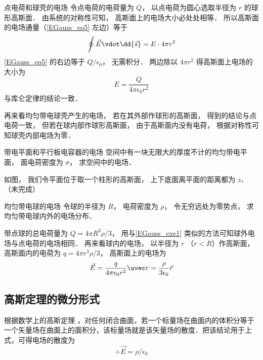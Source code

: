 \begin{exam}{点电荷和球壳的电场}\label{EGauss_exe1}
令点电荷的电荷量为 $Q$， 以点电荷为圆心选取半径为 $r$ 的球形高斯面． 由系统的对称性可知， 高斯面上的电场大小必处处相等． 所以高斯面的电场通量（\autoref{EGauss_eq5} 左边）等于
\begin{equation}
\oint \vec E \vdot \dd{\vec s} = E \cdot 4\pi r^2
\end{equation}
\autoref{EGauss_eq5} 的右边等于 $Q/\epsilon_0$， 无需积分． 两边除以 $4\pi r^2$ 得高斯面上电场的大小为
\begin{equation}
E = \frac{Q}{4\pi\epsilon_0 r^2}
\end{equation}
与库仑定律的结论一致．

再来看均匀带电球壳产生的电场， 若在其外部作球形的高斯面， 得到的结论与点电荷一致， 但若在球内部作球形高斯面， 由于高斯面内没有电荷， 根据对称性可知球壳内部电场为零．
\end{exam}


\begin{exam}{带电平面和平行板电容器的电场}
空间中有一块无限大的厚度不计的均匀带电平面， 面电荷密度为 $\sigma$， 求空间中的电场．

如图， 我们令平面位于取一个柱形的高斯面， 上下底面离平面的距离都为 $z$． 
（未完成）
\end{exam}

\begin{exam}{均匀带电球的电场}\label{EGauss_exe3}
令球的半径为 $R$， 电荷密度为 $\rho$， 令无穷远处为零势点， 求均匀带电球内外的电场分布． 

带点球的总电荷量为 $Q = 4\pi R^3\rho/3$， 用与\autoref{EGauss_exe1} 类似的方法可知球外电场与点电荷的电场相同． 再来看球内的电场， 以半径为 $r$ （$r < R$）作高斯面， 高斯面内的电荷为 $q = 4\pi r^3\rho/3$， 高斯面上的电场为
\begin{equation}
\vec E = \frac{q}{4\pi\epsilon_0 r^2} \uvec r = \frac{\rho}{3\epsilon_0}\vec r
\end{equation}
\end{exam}

\subsection{高斯定理的微分形式}

根据数学上的高斯定理%
，对任何闭合曲面，若一个标量场在曲面内的体积分等于一个矢量场在曲面上的面积分，该标量场就是该矢量场的散度．把该结论用于上式，可得电场的散度为
\begin{equation}
\div \vec E = \rho / \epsilon_0
\end{equation} 

